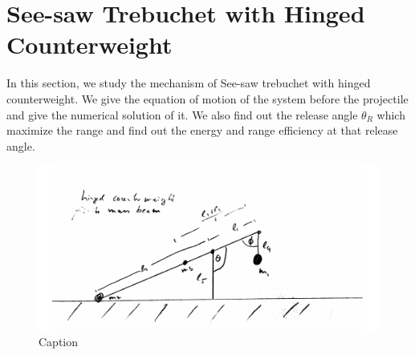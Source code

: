 \documentclass[%
reprint,
amsmath,amssymb,
aps,
]{revtex4-1}
\begin{document}
	\section{See-saw Trebuchet with Hinged Counterweight}
	In this section, we study the mechanism of See-saw trebuchet with hinged counterweight. We give the equation of motion of the system before the projectile and give the numerical solution of it. We also find out the release angle $\theta_R$ which maximize the range and find out the energy and range efficiency at that release angle.
	\begin{figure}[h]
		\centering
		\includegraphics[scale=0.6]{HingedCounterweight.png}
		\caption{Caption}
	\end{figure}
\end{document}
